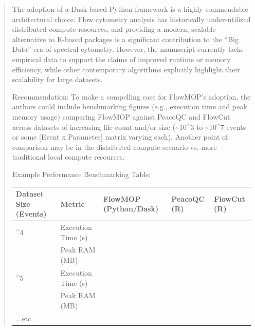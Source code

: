 \documentclass[
  11pt,
  a4paper,
]{article}
\newcounter{none} %
\begin{document}
\begin{quote}
The adoption of a Dask-based Python framework is a highly commendable
architectural choice. Flow cytometry analysis has historically
under-utilized distributed compute resources, and providing a modern,
scalable alternative to R-based packages is a significant contribution
to the ``Big Data'' era of spectral cytometry. However, the manuscript
currently lacks empirical data to support the claims of improved runtime
or memory efficiency, while other contemporary algorithms explicitly
highlight their scalability for large datasets.

Recommendation: To make a compelling case for FlowMOP's adoption, the
authors could include benchmarking figures (e.g., execution time and
peak memory usage) comparing FlowMOP against PeacoQC and FlowCut across
datasets of increasing file count and/or size (\textasciitilde10\^{}3 to
\textasciitilde10\^{}7 events or some {[}Event x Parameter{]} matrix
varying each). Another point of comparison may be in the distributed
compute scenario vs. more traditional local compute resources.

Example Performance Benchmarking Table:

{\def\LTcaptype{none} %
\begin{longtable}[]{@{}
  >{\raggedright\arraybackslash}p{}
  >{\raggedright\arraybackslash}p{}
  >{\raggedright\arraybackslash}p{}
  >{\raggedright\arraybackslash}p{}
  >{\raggedright\arraybackslash}p{}@{}}
\toprule\noalign{}
\begin{minipage}[b]{\linewidth}\raggedright
Dataset Size (Events)
\end{minipage} & \begin{minipage}[b]{\linewidth}\raggedright
Metric
\end{minipage} & \begin{minipage}[b]{\linewidth}\raggedright
FlowMOP (Python/Dask)
\end{minipage} & \begin{minipage}[b]{\linewidth}\raggedright
PeacoQC (R)
\end{minipage} & \begin{minipage}[b]{\linewidth}\raggedright
FlowCut (R)
\end{minipage} \\
\midrule\noalign{}
\endhead
\bottomrule\noalign{}
\endlastfoot
10\^{}4 & Execution Time (s) & & & \\
& Peak RAM (MB) & & & \\
10\^{}5 & Execution Time (s) & & & \\
& Peak RAM (MB) & & & \\
...etc. & & & & \\
\end{longtable}
}
\end{quote}
\end{document}
